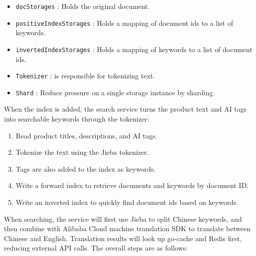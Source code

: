 \documentclass{article}
\begin{document}
\begin{itemize}
    \item \texttt{docStorages} : Holds the original document.
    \item \texttt{positiveIndexStorages} : Holds a mapping of document ids to a list of keywords.
    \item \texttt{invertedIndexStorages} : Holds a mapping of keywords to a list of document ids.
    \item \texttt{Tokenizer} : is responsible for tokenizing text.
    \item \texttt{Shard} : Reduce pressure on a single storage instance by sharding.
\end{itemize}

When the index is added, the search service turns the product text and AI tags into searchable keywords through the tokenizer:

\begin{enumerate}
    \item Read product titles, descriptions, and AI tags.
    \item Tokenize the text using the Jieba tokenizer.
    \item Tags are also added to the index as keywords.
    \item Write a forward index to retrieve documents and keywords by document ID.
    \item Write an inverted index to quickly find document ids based on keywords.
\end{enumerate}

When searching, the service will first use Jieba to split Chinese keywords, and then combine with Alibaba Cloud machine translation SDK to translate between Chinese and English. Translation results will look up go-cache and Redis first, reducing external API calls. The overall steps are as follows:
\end{document}
